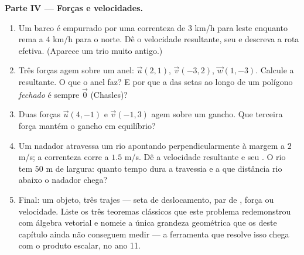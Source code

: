 \begin{problem}
\medskip
\noindent\textbf{Parte IV --- Forças e velocidades.}
\begin{enumerate}[resume]
  \item Um barco é empurrado por uma correnteza de $3$ km/h para
        leste enquanto rema a $4$ km/h para o norte. Dê o 
        velocidade resultante, seu  e descreva a rota
        efetiva. (Aparece um trio muito antigo.)
  \item Três forças agem sobre um anel: $\vec u(2, 1)$,
        $\vec v(-3, 2)$, $\vec w(1, -3)$. Calcule a resultante. O
        que o anel faz? E por que a  das setas ao longo de um
        polígono \emph{fechado} é sempre $\vec 0$ (Chasles)?
  \item Duas forças $\vec u(4, -1)$ e $\vec v(-1, 3)$ agem sobre
        um gancho. Que terceira força mantém o gancho em
        equilíbrio?
  \item Um nadador atravessa um rio apontando perpendicularmente
        à margem a $2$ m/s; a correnteza corre a $1.5$ m/s. Dê a
        velocidade resultante e seu . O rio tem $50$ m de
        largura: quanto tempo dura a travessia e a que distância
        rio abaixo o nadador chega?
  \item Final: um objeto, três trajes --- seta de deslocamento,
        par de , força ou velocidade. Liste os três
        teoremas clássicos que este problema redemonstrou com
        álgebra vetorial e nomeie a única grandeza geométrica que
        os  deste capítulo ainda não conseguem medir --- a
        ferramenta que resolve isso chega com o produto escalar,
        no ano 11.
\end{enumerate}
\end{problem}
